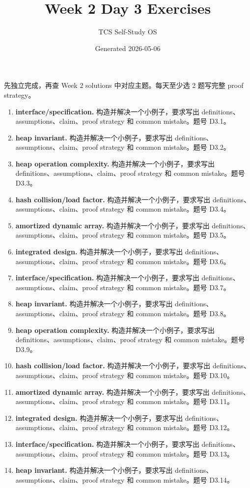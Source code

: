 \documentclass[11pt]{ctexart}
\title{Week 2 Day 3 Exercises}
\author{TCS Self-Study OS}
\date{Generated 2026-05-06}
\begin{document}
\maketitle
先独立完成，再查 Week 2 solutions 中对应主题。每天至少选 2 题写完整 proof strategy。
\begin{enumerate}
  \item \textbf{interface/specification.} 构造并解决一个小例子，要求写出 definitions、assumptions、claim、proof strategy 和 common mistake。题号 D3.1。
  \item \textbf{heap invariant.} 构造并解决一个小例子，要求写出 definitions、assumptions、claim、proof strategy 和 common mistake。题号 D3.2。
  \item \textbf{heap operation complexity.} 构造并解决一个小例子，要求写出 definitions、assumptions、claim、proof strategy 和 common mistake。题号 D3.3。
  \item \textbf{hash collision/load factor.} 构造并解决一个小例子，要求写出 definitions、assumptions、claim、proof strategy 和 common mistake。题号 D3.4。
  \item \textbf{amortized dynamic array.} 构造并解决一个小例子，要求写出 definitions、assumptions、claim、proof strategy 和 common mistake。题号 D3.5。
  \item \textbf{integrated design.} 构造并解决一个小例子，要求写出 definitions、assumptions、claim、proof strategy 和 common mistake。题号 D3.6。
  \item \textbf{interface/specification.} 构造并解决一个小例子，要求写出 definitions、assumptions、claim、proof strategy 和 common mistake。题号 D3.7。
  \item \textbf{heap invariant.} 构造并解决一个小例子，要求写出 definitions、assumptions、claim、proof strategy 和 common mistake。题号 D3.8。
  \item \textbf{heap operation complexity.} 构造并解决一个小例子，要求写出 definitions、assumptions、claim、proof strategy 和 common mistake。题号 D3.9。
  \item \textbf{hash collision/load factor.} 构造并解决一个小例子，要求写出 definitions、assumptions、claim、proof strategy 和 common mistake。题号 D3.10。
  \item \textbf{amortized dynamic array.} 构造并解决一个小例子，要求写出 definitions、assumptions、claim、proof strategy 和 common mistake。题号 D3.11。
  \item \textbf{integrated design.} 构造并解决一个小例子，要求写出 definitions、assumptions、claim、proof strategy 和 common mistake。题号 D3.12。
  \item \textbf{interface/specification.} 构造并解决一个小例子，要求写出 definitions、assumptions、claim、proof strategy 和 common mistake。题号 D3.13。
  \item \textbf{heap invariant.} 构造并解决一个小例子，要求写出 definitions、assumptions、claim、proof strategy 和 common mistake。题号 D3.14。
\end{enumerate}
\end{document}
